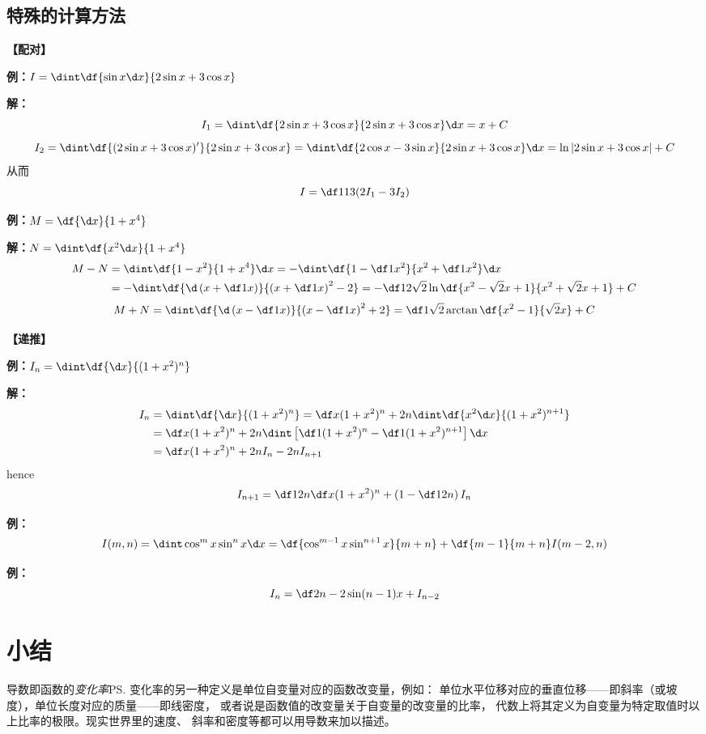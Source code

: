 \begin{shaded}

\section*{特殊的计算方法}

{\bf 【配对】}

{\bf 例：}$I=\dint\df{\sin x\d x}{2\sin x+3\cos x}$

{\bf 解：}
$$I_1=\dint\df{2\sin x+3\cos x}{2\sin x+3\cos x}\d x=x+C$$
$$I_2=\dint\df{(2\sin x+3\cos x)'}{2\sin x+3\cos x}
=\dint\df{2\cos x-3\sin x}{2\sin x+3\cos x}\d x=\ln|2\sin x+3\cos x|+C$$
从而
$$I=\df1{13}(2I_1-3I_2)$$

{\bf 例：}$M=\df{\d x}{1+x^4}$

{\bf 解：}$N=\dint\df{x^2\d x}{1+x^4}$
\begin{align}
M-N&=\dint\df{1-x^2}{1+x^4}\d x=-\dint\df{1-\df1{x^2}}{x^2+\df1{x^2}}\d
x\notag\\
&=-\dint\df{\d\left(x+\df1x\right)}{\left(x+\df1x\right)^2-2}
=-\df1{2\sqrt2}\ln\df{x^2-\sqrt2x+1}{x^2+\sqrt2x+1}+C\notag
\end{align}
$$M+N=\dint\df{\d\left(x-\df1x\right)}{\left(x-\df1x\right)^2+2}
=\df1{\sqrt2}\arctan\df{x^2-1}{\sqrt2x}+C$$

{\bf 【递推】}

{\bf 例：}$I_n=\dint\df{\d x}{(1+x^2)^n}$

{\bf 解：}
\begin{align}
I_n&=\dint\df{\d x}{(1+x^2)^n}=\df x{(1+x^2)^n}+2n\dint\df{x^2\d x}
{(1+x^2)^{n+1}}\notag\\
&=\df x{(1+x^2)^n}+2n\dint\left[\df1{(1+x^2)^n}-
\df1{(1+x^2)^{n+1}}\right]\d x\notag\\
&=\df x{(1+x^2)^n}+2nI_n-2nI_{n+1}\notag
\end{align}
hence
$$I_{n+1}=\df1{2n}\df x{(1+x^2)^n}+\left(1-\df1{2n}\right)I_n$$

{\bf 例：}
$$I(m,n)=\dint\cos^mx\sin^nx\d x=
\df{\cos^{m-1}x\sin^{n+1}x}{m+n}+\df{m-1}{m+n}I(m-2,n)$$

{\bf 例：}
$$I_n=\df2{n-2}\sin(n-1)x+I_{n-2}$$
\end{shaded}

\section{小结}

导数即函数的{\it 变化率}\ps{变化率的另一种定义是单位自变量对应的函数改变量，例如：
单位水平位移对应的垂直位移——即斜率（或坡度），单位长度对应的质量——即线密度}，
或者说是函数值的改变量关于自变量的改变量的比率，
代数上将其定义为自变量为特定取值时以上比率的极限。现实世界里的速度、
斜率和密度等都可以用导数来加以描述。

